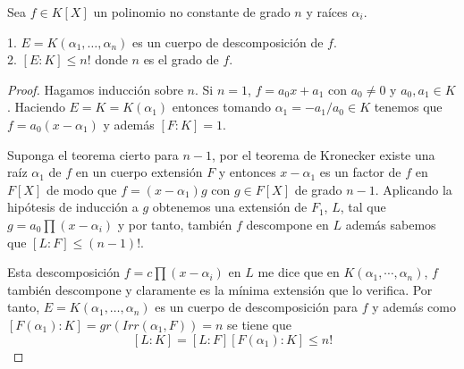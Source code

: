 \begin{proposition}
	Sea $f \in K[X]$ un polinomio no constante de grado $n$ y raíces $\alpha_i$. 
	
	1. $E = K(\alpha_1,\ldots,\alpha_n)$ es un cuerpo de descomposición de $f$. \\
	2. $[E:K] \le n!$ donde $n$ es el grado de $f$.
\end{proposition}
\begin{proof}
	Hagamos inducción sobre $n$. Si $n =  1$, $f = a_0x+a_1$ con $a_0 \neq 0$ y $a_0,a_1 \in K$. Haciendo $E = K = K(\alpha_1)$ entonces tomando $\alpha_1 = -a_1/a_0 \in K$ tenemos que $f = a_0(x-\alpha_1)$ y además $[F:K] = 1$. 
	
	Suponga el teorema cierto para $n-1$, por el teorema de Kronecker existe una raíz $\alpha_1$ de $f$ en un cuerpo extensión $F$ y entonces $x-\alpha_1$ es un factor de $f$ en $F[X]$ de modo que $f = (x-\alpha_1)g$ con $g \in F[X]$ de grado $n-1$. Aplicando la hipótesis de inducción a $g$ obtenemos una extensión de $F_1$, $L$, tal que $g = a_0 \prod (x - \alpha_i)$ y por tanto, también $f$ descompone en $L$ además sabemos que $[L:F] \le (n-1)!$. 
	
	Esta descomposición $f = c \prod (x - \alpha_i)$ en $L$ me dice que en $K(\alpha_1,\cdots,\alpha_n)$, $f$ también descompone y claramente es la mínima extensión que lo verifica. Por tanto, $E=K(\alpha_1,\ldots,\alpha_n)$ es un cuerpo de descomposición para $f$ y además como $[F(\alpha_1):K] = gr(Irr(\alpha_1,F)) = n$ se tiene que $$[L:K] = [L:F][F(\alpha_1):K] \le n!$$
\end{proof}

